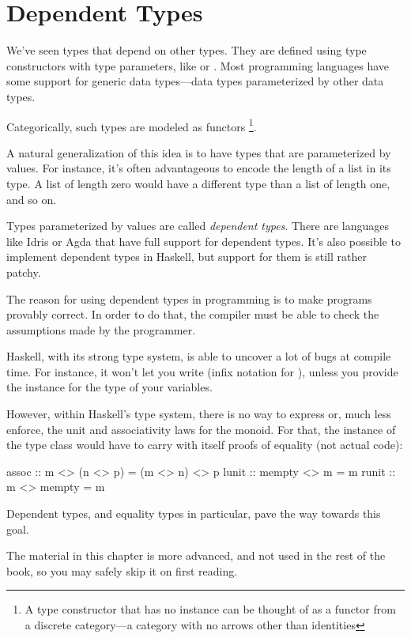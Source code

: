 \documentclass[DaoFP]{subfiles}
\begin{document}
\setcounter{chapter}{10}

\chapter{Dependent Types}

We've seen types that depend on other types. They are defined using type constructors with type parameters, like  or \hask{[]}. Most programming languages have some support for generic data types---data types parameterized by other data types.

Categorically, such types are modeled as functors \footnote{A type constructor that has no  instance can be thought of as a functor from a discrete category---a category with no arrows other than identities}.

A natural generalization of this idea is to have types that are parameterized by values. For instance, it's often advantageous to encode the length of a list in its type. A list of length zero would have a different type than a list of length one, and so on. 

Types parameterized by values are called \emph{dependent types}. There are languages like Idris or Agda that have full support for dependent types. It's also possible to implement dependent types in Haskell, but support for them is still rather patchy. 

The reason for using dependent types in programming is to make programs provably correct. In order to do that, the compiler must be able to check the assumptions made by the programmer. 

Haskell, with its strong type system, is able to uncover a lot of bugs at compile time. For instance, it won't let you write  (infix notation for ), unless you provide the  instance for the type of your variables. 

However, within Haskell's type system, there is no way to express or, much less enforce, the unit and associativity laws for the monoid. For that, the instance of the  type class would have to carry with itself proofs of equality (not actual code):
\begin{haskell}
assoc :: m <> (n <> p) = (m <> n) <> p
lunit :: mempty <> m = m
runit :: m <> mempty = m
\end{haskell}
Dependent types, and equality types in particular, pave the way towards this goal.

The material in this chapter is more advanced, and not used in the rest of the book, so you may safely skip it on first reading.
\end{document}
